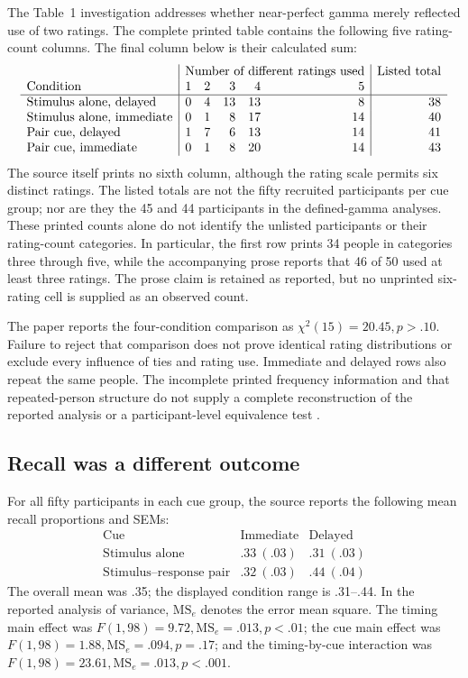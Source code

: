 The Table~1 investigation addresses whether near-perfect gamma
merely reflected use of two ratings. The complete printed table
contains the following five rating-count columns.
The final column below is their calculated sum:
\[
\begin{array}{l|rrrrr|r}
 &\multicolumn{5}{c|}{\text{Number of different ratings used}}&
 \text{Listed total}\\
 \text{Condition}&1&2&3&4&5&\\\hline
 \text{Stimulus alone, delayed}&0&4&13&13&8&38\\
 \text{Stimulus alone, immediate}&0&1&8&17&14&40\\
 \text{Pair cue, delayed}&1&7&6&13&14&41\\
 \text{Pair cue, immediate}&0&1&8&20&14&43
\end{array}
\]
The source itself prints no sixth column, although the rating
scale permits six distinct ratings. The listed totals are not
the fifty recruited participants per cue group; nor are they
the 45 and 44 participants in the defined-gamma analyses.
These printed counts alone do not identify the unlisted
participants or their rating-count categories.
In particular, the first row prints 34 people in categories
three through five, while the accompanying prose reports that
46 of 50 used at least three ratings.
The prose claim is retained as reported, but no unprinted
six-rating cell is supplied as an observed count.

The paper reports the four-condition comparison as
\(\chi^2(15)=20.45,p>.10\).
Failure to reject that comparison does not prove identical
rating distributions or exclude every influence of ties and
rating use. Immediate and delayed rows also repeat the same
people. The incomplete printed frequency information and that
repeated-person structure do not supply a complete reconstruction
of the reported analysis or a participant-level equivalence test
\cite[pp.~377--378, table~1]{DunloskyNelson1992CueJOL}.

\subsection{Recall was a different outcome}

For all fifty participants in each cue group, the source reports
the following mean recall proportions and SEMs:
\[
\begin{array}{l|cc}
 \text{Cue}&\text{Immediate}&\text{Delayed}\\\hline
 \text{Stimulus alone}&.33\ (.03)&.31\ (.03)\\
 \text{Stimulus--response pair}&.32\ (.03)&.44\ (.04)
\end{array}
\]
The overall mean was .35; the displayed condition range is
.31--.44. In the reported analysis of variance,
\(\mathrm{MS}_e\) denotes the error mean square.
The timing main effect was
\(F(1,98)=9.72,\mathrm{MS}_e=.013,p<.01\);
the cue main effect was
\(F(1,98)=1.88,\mathrm{MS}_e=.094,p=.17\);
and the timing-by-cue interaction was
\(F(1,98)=23.61,\mathrm{MS}_e=.013,p<.001\).

